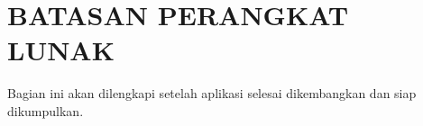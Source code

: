 \section{BATASAN PERANGKAT LUNAK}

Bagian ini akan dilengkapi setelah aplikasi selesai dikembangkan dan siap dikumpulkan.
